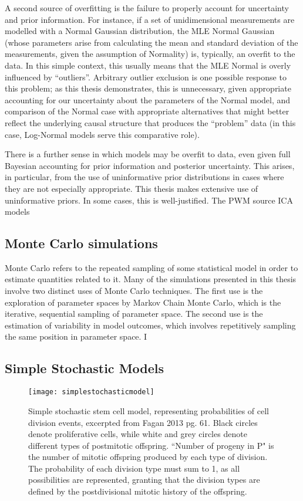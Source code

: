 A second source of overfitting is the failure to properly account for uncertainty and prior information. For instance, if a set of unidimensional measurements are modelled with a Normal Gaussian distribution, the MLE Normal Gaussian (whose parameters arise from calculating the mean and standard deviation of the measurements, given the assumption of Normality) is, typically, an overfit to the data. In this simple context, this usually means that the MLE Normal is overly influenced by ``outliers''. Arbitrary outlier exclusion is one possible response to this problem; as this thesis demonstrates, this is unnecessary, given appropriate accounting for our uncertainty about the parameters of the Normal model, and comparison of the Normal case with appropriate alternatives that might better reflect the underlying causal structure that produces the ``problem'' data (in this case, Log-Normal models serve this comparative role). 

There is a further sense in which models may be overfit to data, even given full Bayesian accounting for prior information and posterior uncertainty. This arises, in particular, from the use of uninformative prior distributions in cases where they are not especially appropriate. This thesis makes extensive use of uninformative priors. In some cases, this is well-justified. The PWM source ICA models 


\subsection{Monte Carlo simulations}
\label{ssec:MonteCarlo}
Monte Carlo refers to the repeated sampling of some statistical model in order to estimate quantities related to it. Many of the simulations presented in this thesis involve two distinct uses of Monte Carlo techniques. The first use is the exploration of parameter spaces by Markov Chain Monte Carlo, which is the iterative, sequential sampling of parameter space. The second use is the estimation of variability in model outcomes, which involves repetitively sampling the same position in parameter space. I
 
\subsection{Simple Stochastic Models}
\label{SSM}

\begin{figure}
\texttt{[image: simplestochasticmodel]}
\centering
\caption{Simple stochastic stem cell model, representing probabilities of cell division events, excerpted from Fagan 2013 pg. 61. Black circles denote proliferative cells, while white and grey circles denote different types of postmitotic offspring. ``Number of progeny in P" is the number of mitotic offspring produced by each type of division. The probability of each division type must sum to 1, as all possibilities are represented, granting that the division types are defined by the postdivisional mitotic history of the offspring.}
\label{fig:SSM}
\end{figure}

